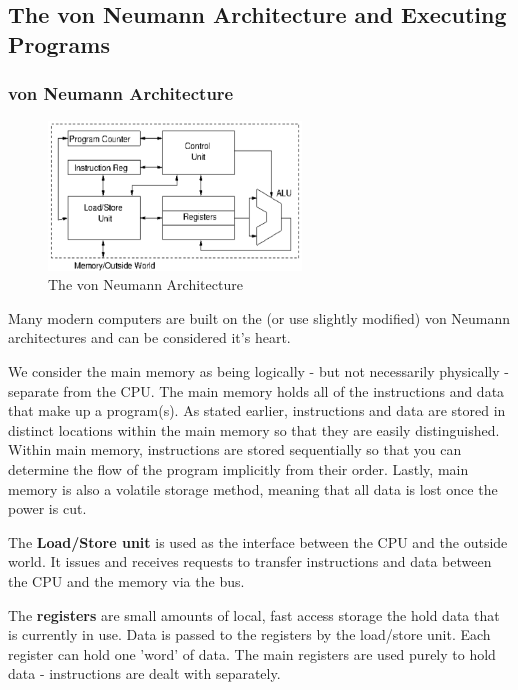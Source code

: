 \documentclass{article}
\begin{document}
	\subsection{The von Neumann Architecture and Executing Programs}
	\subsubsection{von Neumann Architecture}
	\begin{figure}[h]
		\centering
		\includegraphics[width=0.6\textwidth]{von_neumann}
		\caption{The von Neumann Architecture}
		\label{fig:von neumann}
	\end{figure}
	
	Many modern computers are built on the (or use slightly modified) von Neumann architectures and can be considered it's heart. 
	
	\par	
	We consider the main memory as being logically - but not necessarily physically - separate from the CPU. The main memory holds all of the instructions and data that make up a program(s). As stated earlier, instructions and data are stored in distinct locations within the main memory so that they are easily distinguished. Within main memory, instructions are stored sequentially so that you can determine the flow of the program implicitly from their order. Lastly, main memory is also a volatile storage method, meaning that all data is lost once the power is cut.
	
	\par 
	The \textbf{Load/Store unit} is used as the interface between the CPU and the outside world. It issues and receives requests to transfer instructions and data between the CPU and the memory via the bus.
	
	\par
	The \textbf{registers} are small amounts of local, fast access storage the hold data that is currently in use. Data is passed to the registers by the load/store unit. Each register can hold one 'word' of data. The main registers are used purely to hold data - instructions are dealt with separately.
	
\end{document}
